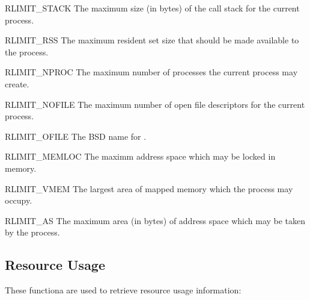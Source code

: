 \begin{datadesc}{RLIMIT_STACK}
  The maximum size (in bytes) of the call stack for the current
  process.
\end{datadesc}

\begin{datadesc}{RLIMIT_RSS}
  The maximum resident set size that should be made available to the
  process.
\end{datadesc}

\begin{datadesc}{RLIMIT_NPROC}
  The maximum number of processes the current process may create.
\end{datadesc}

\begin{datadesc}{RLIMIT_NOFILE}
  The maximum number of open file descriptors for the current
  process.
\end{datadesc}

\begin{datadesc}{RLIMIT_OFILE}
  The BSD name for .
\end{datadesc}

\begin{datadesc}{RLIMIT_MEMLOC}
  The maximm address space which may be locked in memory.
\end{datadesc}

\begin{datadesc}{RLIMIT_VMEM}
  The largest area of mapped memory which the process may occupy.
\end{datadesc}

\begin{datadesc}{RLIMIT_AS}
  The maximum area (in bytes) of address space which may be taken by
  the process.
\end{datadesc}

\subsection{Resource Usage}

These functiona are used to retrieve resource usage information:

